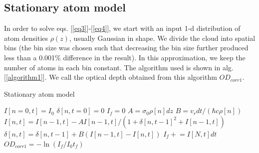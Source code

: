 \documentclass[12pt]{iopart}
\begin{document}
\subsection{Stationary atom model}
In order to solve eqs. [\ref{eq3}]-[\ref{eq4}], we start with an input 1-d distribution of atom densities $\rho(z)$, usually Gaussian in shape. We divide the cloud into spatial bins (the bin size was chosen such that decreasing the bin size further produced less than a 0.001$\%$ difference in the result).  In this approximation, we keep the number of atoms in each bin constant.  The algorithm used is shown in alg. [\ref{algorithm1}]. We call the optical depth obtained from this algorithm $OD_{corr1}$.

\begin{algorithm}
\caption{Stationary atom model}
\label{algorithm1}
\begin{algorithmic}
\STATE $I[n=0,t]=I_0$  
\STATE $\delta[n, t=0]=0$ 
\STATE $I_f=0$
 \STATE $A=\sigma_0\rho[n] dz$
 \STATE $B=v_r dt/(\hbar c \rho[n])$ 
\STATE $I[n,t]=I[n-1,t] - A I[n-1,t]/(1+\delta[n,t-1]^2+I[n-1,t])$  
\STATE $\delta[n,t]=\delta[n,t-1]+B\left(I[n-1,t]-I[n,t]\right)$   
\ENDFOR 
\STATE $I_f  \mathrel{+}= I[N,t]dt$
\ENDFOR
\STATE $OD_{corr1}=-\ln{(I_f/I_0t_f)}$
\end{algorithmic}
\end{algorithm}
\end{document}
